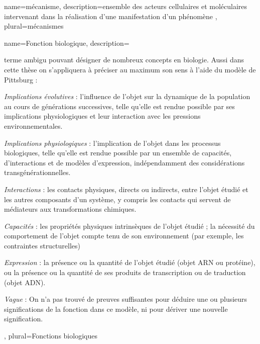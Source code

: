
\printglossary[nonumberlist]
\glsaddall


{
	name={m\'{e}canisme},
	description={ensemble des acteurs cellulaires et moléculaires intervenant dans la réalisation d'une manifestation d'un phénomène \cite{Bechtel2013}}, 
	plural={m\'{e}canismes}
}

{
	name={Fonction biologique},
	description={terme ambigu pouvant désigner de nombreux concepts en biologie. Aussi dans cette thèse on s'appliquera à préciser au maximum son sens à l'aide du modèle de Pittsburg \cite{Marie2019}:
	\begin{description}
	    \item \textit{Implications évolutives} : l'influence de l'objet sur la dynamique de la population au cours de générations successives, telle qu'elle est rendue possible par ses implications physiologiques et leur interaction avec les pressions environnementales.
	    \item \textit{Implications physiologiques} : l'implication de l'objet dans les processus biologiques, telle qu'elle est rendue possible par un ensemble de capacités, d'interactions et de modèles d'expression, indépendamment des considérations transgénérationnelles.
	    \item \textit{Interactions} : les contacts physiques, directs ou indirects, entre l'objet étudié et les autres composants d'un système, y compris les contacts qui servent de médiateurs aux transformations chimiques.
	    \item \textit{Capacités} : les propriétés physiques intrinsèques de l'objet étudié ; la nécessité du comportement de l'objet compte tenu de son environnement (par exemple, les contraintes structurelles)
	    \item \textit{Expression} : la présence ou la quantité de l'objet étudié (objet ARN ou protéine), ou la présence ou la quantité de ses produits de transcription ou de traduction (objet ADN).
	    \item \textit{Vague} : On n'a pas trouvé de preuves suffisantes pour déduire une ou plusieurs significations de la fonction dans ce modèle, ni pour dériver une nouvelle signification.
	\end{description}
	}, 
	plural={Fonctions biologiques}
}



